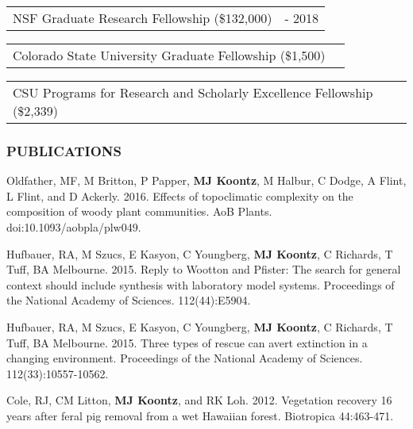 \documentclass[11pt,english]{article}
\begin{document}
\begin{tabular}{>{\raggedright}p{5in}>{\raggedleft}p{1in}}
NSF Graduate Research Fellowship (\$132,000) & 2013 - 2018
\end{tabular}

\begin{tabular}{>{\raggedright}p{5in}>{\raggedleft}p{1in}}
Colorado State University Graduate Fellowship (\$1,500) & 2012
\end{tabular}

\begin{tabular}{>{\raggedright}p{5.4in}>{\raggedleft}p{0.6in}}
CSU Programs for Research and Scholarly Excellence Fellowship (\$2,339) & 2012
\end{tabular}


\subsubsection*{PUBLICATIONS}
\vspace{-0.5ex}

\begin{hangparas}{.5in}{1}

\hspace{0.575em}Oldfather, MF, M Britton, P Papper, \textbf{MJ Koontz}, M Halbur, C Dodge, A Flint, L Flint, and D Ackerly. 2016. Effects of topoclimatic complexity on the composition of woody plant communities. AoB Plants. doi:10.1093/aobpla/plw049.

\hspace{0.575em}Hufbauer, RA, M Szucs, E Kasyon, C Youngberg, \textbf{MJ Koontz}, C Richards, T Tuff, BA Melbourne. 2015. Reply to Wootton and Pfister: The search for general context should include synthesis with laboratory model systems. Proceedings of the National Academy of Sciences. 112(44):E5904.

\hspace{0.575em}Hufbauer, RA, M Szucs, E Kasyon, C Youngberg, \textbf{MJ Koontz}, C Richards, T Tuff, BA Melbourne. 2015. Three types of rescue can avert extinction in a changing environment. Proceedings of the National Academy of Sciences. 112(33):10557-10562.

\hspace{0.575em}Cole, RJ, CM Litton, \textbf{MJ Koontz}, and RK
Loh. 2012. Vegetation recovery 16 years after feral pig removal from
a wet Hawaiian forest. Biotropica 44:463-471.

\end{hangparas}
\vspace{1ex}
\end{document}
